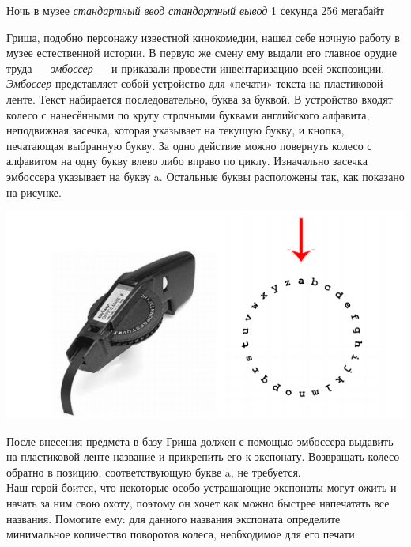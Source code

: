 \begin{problem}%
{Ночь в музее}%
{\textsl{стандартный ввод}}%
{\textsl{стандартный вывод}}%
{1 секунда}%
{256 мегабайт}%
{}

Гриша, подобно персонажу известной кинокомедии, нашел себе ночную работу в музее естественной истории. В первую же смену ему выдали его главное орудие труда — \textit{эмбоссер} — и приказали провести инвентаризацию всей экспозиции.\\

\textit{Эмбоссер} представляет собой устройство для «печати» текста на пластиковой ленте. Текст набирается последовательно, буква за буквой. В устройство входят колесо с нанесёнными по кругу строчными буквами английского алфавита, неподвижная засечка, которая указывает на текущую букву, и кнопка, печатающая выбранную букву. За одно действие можно повернуть колесо с алфавитом на одну букву влево либо вправо по циклу. Изначально засечка эмбоссера указывает на букву a. Остальные буквы расположены так, как показано на рисунке.\\

\begin{center}
\includegraphics{images/2962.png}
\end{center}

После внесения предмета в базу Гриша должен с помощью эмбоссера выдавить на пластиковой ленте название и прикрепить его к экспонату. Возвращать колесо обратно в позицию, соответствующую букве a, не требуется.\\

Наш герой боится, что некоторые особо устрашающие экспонаты могут ожить и начать за ним свою охоту, поэтому он хочет как можно быстрее напечатать все названия. Помогите ему: для данного названия экспоната определите минимальное количество поворотов колеса, необходимое для его печати.


\end{problem}
